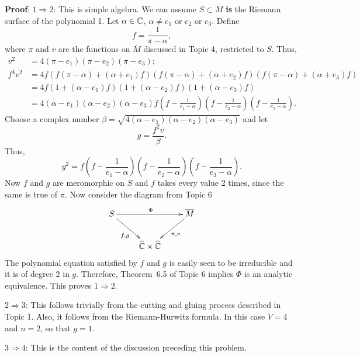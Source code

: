 \documentclass[a4paper,11pt]{article}
\begin{document}
\begin{mdframed}
  \textbf{Proof}: \underline{$1 \Rightarrow 2$}: This is simple
  algebra.  We can assume $S \subset \overline{M}$ \textbf{is} the
  Riemann surface of the polynomial 1.  Let $\alpha \in {\mathbb C}$, $\alpha
  \ne e_1$ or $e_2$ or $e_3$.  Define
  $$
  f = \frac{1}{\pi - \alpha},
  $$
  where $\pi$ and $v$ are the functions on $\overline{M}$ discussed in
  Topic 4, restricted to $S$.  Thus,
  $$
  \begin{aligned}
    v^2 &= 4(\pi-e_1)(\pi-e_2)(\pi-e_3);\\
    f^4 v^2 &= 4f(f(\pi - \alpha) + (\alpha + e_1)f)
    (f(\pi - \alpha) + (\alpha + e_2)f)
    (f(\pi - \alpha) + (\alpha + e_3)f)\\
    &= 4f(1 + (\alpha-e_1)f)(1 + (\alpha-e_2)f)(1 + (\alpha-e_3)f)\\
    &= 4(\alpha-e_1)(\alpha-e_2)(\alpha-e_3)
    f(f-\frac{1}{e_1-\alpha})(f-\frac{1}{e_2-\alpha})
    (f-\frac{1}{e_3-\alpha}).
  \end{aligned}
  $$
  Choose a complex number $\beta = \sqrt{4(\alpha-e_1)(\alpha-e_2)
    (\alpha-e_3)}$ and let
  $$
  g = \frac{f^2 v}{\beta}.
  $$
  Thus,
  $$
  g^2 = f(f-\frac{1}{e_1-\alpha})(f-\frac{1}{e_2-\alpha})
  (f-\frac{1}{e_3-\alpha}).
  $$
  Now $f$ and $g$ are meromorphic on $S$ and $f$ takes every value 2
  times, since the same is true of $\pi$.  Now consider the diagram
  from Topic 6
  $$
  \xymatrix {
    S \ar[rr]^{\Phi} \ar[dr]_{f,g} && \overline{M} \ar[dl]^{\pi, v}\\
    & \widehat{\CCC} \times \widehat{\CCC}
  }
  $$
  The polynomial equation satisfied by $f$ and $g$ is easily seen to
  be irreducible and it is of degree 2 in $g$.  Therefore, Theorem~6.5
  of Topic 6 implies $\Phi$ is an analytic equivalence.  This
  proves $1 \Rightarrow 2$.


  \underline{$2 \Rightarrow 3$}:
  This follows trivially from the cutting and gluing process described
  in Topic 1.  Also, it follows from the Riemann-Hurwitz formula.  In
  this case $V = 4$ and $n = 2$, so that $g = 1$.

  \underline{$3 \Rightarrow 4$}:
  This is the content of the discussion preceding this problem.


\end{mdframed}
\end{document}
